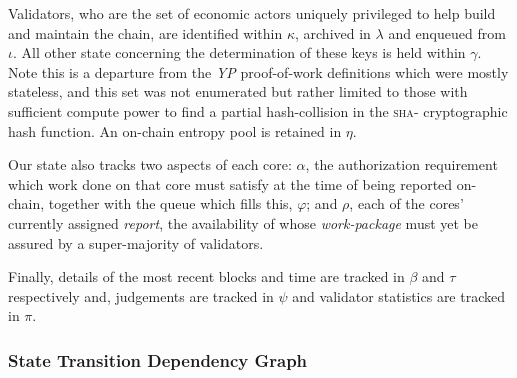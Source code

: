 Validators, who are the set of economic actors uniquely privileged to help build and maintain the \Jam chain, are identified within $\kappa$, archived in $\lambda$ and enqueued from $\iota$. All other state concerning the determination of these keys is held within $\gamma$. Note this is a departure from the \emph{YP} proof-of-work definitions which were mostly stateless, and this set was not enumerated but rather limited to those with sufficient compute power to find a partial hash-collision in the \textsc{sha}- cryptographic hash function. An on-chain entropy pool is retained in $\eta$.

Our state also tracks two aspects of each core: $\alpha$, the authorization requirement which work done on that core must satisfy at the time of being reported on-chain, together with the queue which fills this, $\varphi$; and $\rho$, each of the cores' currently assigned \emph{report}, the availability of whose \emph{work-package} must yet be assured by a super-majority of validators.

Finally, details of the most recent blocks and time are tracked in $\beta$ and $\tau$ respectively and, judgements are tracked in $\psi$ and validator statistics are tracked in $\pi$.

\subsubsection{State Transition Dependency Graph}

